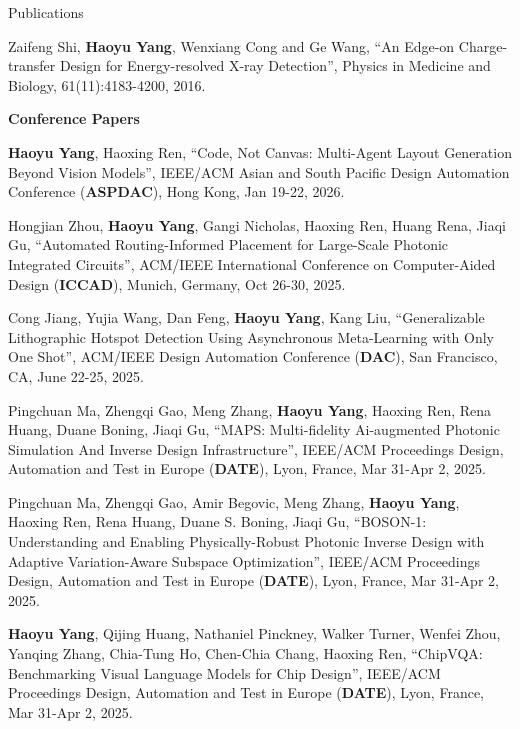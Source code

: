 \begin{rSection}{Publications}
\begin{description}[font=\normalfont]
\item[{[J1]}]{
    Zaifeng Shi, \textbf{Haoyu Yang}, Wenxiang Cong and Ge Wang,
    ``An Edge-on Charge-transfer Design for Energy-resolved X-ray Detection'',
    Physics in Medicine and Biology, 61(11):4183-4200, 2016.
}

\end{description}

\textbf{Conference Papers}
\begin{description}[font=\normalfont]
	
	\item[{[C44]}] \textbf{Haoyu Yang}, Haoxing Ren, ``Code, Not Canvas: Multi-Agent Layout Generation Beyond Vision Models'', IEEE/ACM Asian and South Pacific Design Automation Conference (\textbf{ASPDAC}), Hong Kong, Jan 19-22, 2026.

	\item[{[C43]}] Hongjian Zhou, \textbf{Haoyu Yang}, Gangi Nicholas, Haoxing Ren, Huang Rena, Jiaqi Gu, ``Automated Routing-Informed Placement for Large-Scale Photonic Integrated Circuits'', ACM/IEEE International Conference on Computer-Aided Design (\textbf{ICCAD}), Munich, Germany, Oct 26-30, 2025.
	
	\item[{[C42]}] Cong Jiang, Yujia Wang, Dan Feng, \textbf{Haoyu Yang}, Kang Liu, ``Generalizable Lithographic Hotspot Detection Using Asynchronous Meta-Learning with Only One Shot'', ACM/IEEE Design Automation Conference (\textbf{DAC}), San Francisco, CA, June 22-25, 2025.
	
	\item[{[C41]}] Pingchuan Ma, Zhengqi Gao, Meng Zhang, \textbf{Haoyu Yang}, Haoxing Ren, Rena Huang, Duane Boning, Jiaqi Gu, ``MAPS: Multi-fidelity Ai-augmented Photonic Simulation And Inverse Design Infrastructure'', IEEE/ACM Proceedings Design, Automation and Test in Europe (\textbf{DATE}), Lyon, France, Mar 31-Apr 2, 2025.
	
	\item[{[C40]}] Pingchuan Ma, Zhengqi Gao, Amir Begovic, Meng Zhang, \textbf{Haoyu Yang}, Haoxing Ren, Rena Huang, Duane S. Boning, Jiaqi Gu, ``BOSON-1: Understanding and Enabling Physically-Robust Photonic Inverse Design with Adaptive Variation-Aware Subspace Optimization'', IEEE/ACM Proceedings Design, Automation and Test in Europe (\textbf{DATE}), Lyon, France, Mar 31-Apr 2, 2025.
	
	\item[{[C39]}] \textbf{Haoyu Yang}, Qijing Huang, Nathaniel Pinckney, Walker Turner, Wenfei Zhou, Yanqing Zhang, Chia-Tung Ho, Chen-Chia Chang, Haoxing Ren, ``ChipVQA: Benchmarking Visual Language Models for Chip Design'', IEEE/ACM Proceedings Design, Automation and Test in Europe (\textbf{DATE}), Lyon, France, Mar 31-Apr 2, 2025.
	

\end{description}
\end{rSection}
